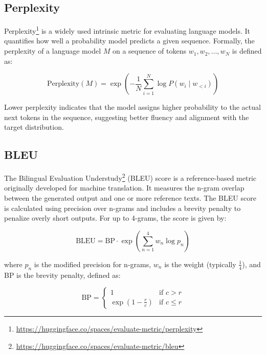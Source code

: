 \subsection{Perplexity}

Perplexity\footnote{\url{https://huggingface.co/spaces/evaluate-metric/perplexity}} is a widely used intrinsic metric for evaluating language models. It quantifies
how well a probability model predicts a given sequence. Formally, the perplexity of a
language model \( M \) on a sequence of tokens \( w_1, w_2, ..., w_N \) is defined as:

\begin{equation}
  \text{Perplexity}(M) = \exp\left(-\frac{1}{N} \sum_{i=1}^{N} \log P(w_i \mid w_{<i})\right)
\end{equation}

Lower perplexity indicates that the model assigns higher probability to the actual
next tokens in the sequence, suggesting better fluency and alignment with the target
distribution.

\subsection{BLEU}

The Bilingual Evaluation Understudy\footnote{\url{https://huggingface.co/spaces/evaluate-metric/bleu}} (BLEU) score is a reference-based metric originally
developed for machine translation. It measures the n-gram overlap between the generated
output and one or more reference texts. The BLEU score is calculated using precision
over n-grams and includes a brevity penalty to penalize overly short outputs. For up to
4-grams, the score is given by:

\begin{equation}
  \text{BLEU} = \text{BP} \cdot \exp\left( \sum_{n=1}^{4} w_n \log p_n \right)
\end{equation}

where \( p_n \) is the modified precision for n-grams, \( w_n \) is the weight (typically \( \frac{1}{4} \)), and BP
is the brevity penalty, defined as:

\begin{equation}
  \text{BP} = 
    \begin{cases}
    1 & \text{if } c > r \\
    \exp\left(1 - \frac{r}{c}\right) & \text{if } c \leq r
    \end{cases}
\end{equation}

